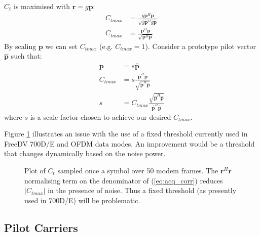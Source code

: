 \documentclass{article}
\begin{document}
$C_t$ is maximised with $\bm{r}=g\bm{p}$:
\begin{equation}
\begin{split}
C_{tmax} &= \frac{g\bm{p}^H \bm{p}}{\sqrt{g\bm{p}^Hg\bm{p}}} \\
C_{tmax} &= \frac{\bm{p}^H \bm{p}}{\sqrt{\bm{p}^H\bm{p}}}
\end{split}
\end{equation}
By scaling $\bm{p}$ we can set $C_{tmax}$ (e.g. $C_{tmax}=1$). Consider a prototype pilot vector $\bm{\hat{p}}$ such that:
\begin{equation}
\begin{split}
\bm{p} &= s\bm{\hat{p}} \\
C_{tmax} &= s\frac{\bm{\hat{p}}^H \bm{\hat{p}}}{\sqrt{\bm{\hat{p}}^H\bm{\hat{p}}}} \\
s &= C_{tmax}\frac{\sqrt{\bm{\hat{p}}^H\bm{\hat{p}}}}{\bm{\hat{p}}^H \bm{\hat{p}}}
\end{split}
\end{equation}
where $s$ is a scale factor chosen to achieve our desired $C_{tmax}$.

Figure \ref{fig:acq_ct_scatter} illustrates an issue with the use of a fixed threshold currently used in FreeDV 700D/E and OFDM data modes.  An improvement would be a threshold that changes dynamically based on the noise power.


\begin{figure}[H]
\caption{Plot of $C_t$ sampled once a symbol over 50 modem frames. The $\bm{r}^H\bm{r}$ normalising term on the denominator of (\ref{eq:acq_corr}) reduces $|C_{tmax}|$ in the presence of noise. Thus a fixed threshold (as presently used in 700D/E) will be problematic.}
\label{fig:acq_ct_scatter}
\begin{center}

\end{center}
\end{figure}



\subsection {Pilot Carriers}
\end{document}
